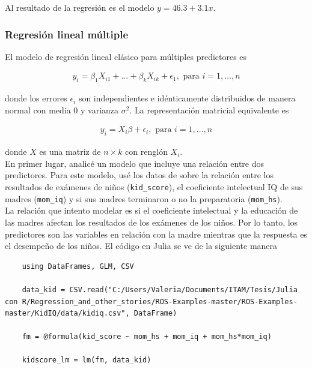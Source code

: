 Al resultado de la regresión es el modelo $y = 46.3 + 3.1x$. 


\subsubsection{Regresión lineal múltiple}


El modelo de regresión lineal clásico para múltiples predictores es 

\begin{equation*}
    \begin{aligned}
    y_i = \beta_1 X_{i1} + \dots + \beta_k X_{ik} + \epsilon_1, \text{ para } i = 1, \dots, n
    \end{aligned}
\end{equation*}

donde los errores $\epsilon_i$ son independientes e idénticamente distribuidos de manera normal con media 0 y varianza $\sigma^2$. La representación matricial equivalente es 

\begin{equation*}
    \begin{aligned}
        y_i = X_i \beta + \epsilon_i, \text{ para } i = 1, \dots, n
    \end{aligned}
\end{equation*}

donde $X$ es una matriz de $n \times k$ con renglón $X_i$.
\\
En primer lugar, analicé un modelo que incluye una relación entre dos predictores. Para este modelo, usé los datos de \citep{regression_other_stories} sobre la relación entre los resultados de exámenes de niños (\texttt{kid\_score}), el coeficiente intelectual IQ de sus madres (\texttt{mom\_iq}) y si sus madres terminaron o no la preparatoria (\texttt{mom\_hs}). 
\\
La relación que intento modelar es si el coeficiente intelectual y la educación de las madres afectan los resultados de los exámenes de los niños. Por lo tanto, los predictores son las variables en relación con la madre mientras que la respuesta es el desempeño de los niños. El código en Julia se ve de la siguiente manera

\begin{verbatim}
    using DataFrames, GLM, CSV

    data_kid = CSV.read("C:/Users/Valeria/Documents/ITAM/Tesis/Julia con R/Regression_and_other_stories/ROS-Examples-master/ROS-Examples-master/KidIQ/data/kidiq.csv", DataFrame)

    fm = @formula(kid_score ~ mom_hs + mom_iq + mom_hs*mom_iq)

    kidscore_lm = lm(fm, data_kid)
\end{verbatim}

